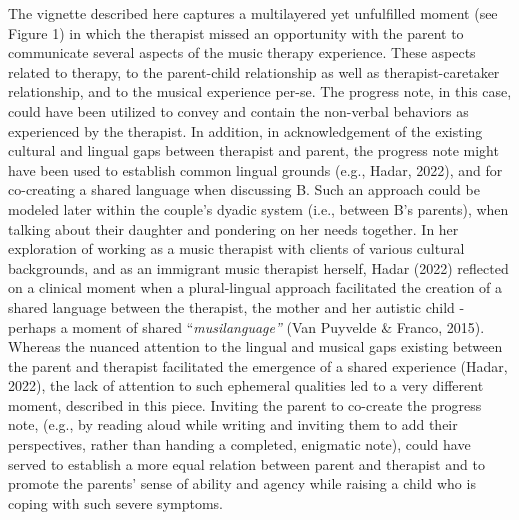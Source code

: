 \documentclass[authordate, empirical, issue]{jote-new-article}
\begin{document}
The vignette described here captures a multilayered yet unfulfilled moment (see Figure 1) in which the therapist missed an opportunity with the parent to communicate several aspects of the music therapy experience. These aspects related to therapy, to the parent-child relationship as well as therapist-caretaker relationship, and to the musical experience per-se. The progress note, in this case, could have been utilized to convey and contain the non-verbal behaviors as experienced by the therapist. In addition, in acknowledgement of the existing cultural and lingual gaps between therapist and parent, the progress note might have been used to establish common lingual grounds (e.g., Hadar, 2022), and for co-creating a shared language when discussing B. Such an approach could be modeled later within the couple's dyadic system (i.e., between B's parents), when talking about their daughter and pondering on her needs together. In her exploration of working as a music therapist with clients of various cultural backgrounds, and as an immigrant music therapist herself, Hadar (2022) reflected on a clinical moment when a plural-lingual approach facilitated the creation of a shared language between the therapist, the mother and her autistic child - perhaps a moment of shared “\emph{musilanguage”} (Van Puyvelde \& Franco, 2015). Whereas the nuanced attention to the lingual and musical gaps existing between the parent and therapist facilitated the emergence of a shared experience (Hadar, 2022), the lack of attention to such ephemeral qualities led to a very different moment, described in this piece. Inviting the parent to co-create the progress note, (e.g., by reading aloud while writing and inviting them to add their perspectives, rather than handing a completed, enigmatic note), could have served to establish a more equal relation between parent and therapist and to promote the parents' sense of ability and agency while raising a child who is coping with such severe symptoms.
\end{document}
